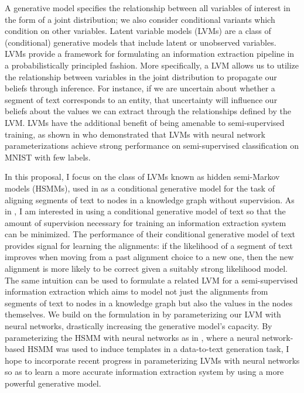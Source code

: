 \documentclass[12pt]{article}
\begin{document}
A generative model specifies the relationship between all variables of interest in
the form of a joint distribution; we also consider conditional variants
which condition on other variables.
Latent variable models (LVMs) are a class of (conditional) generative models
that include latent or unobserved variables.
LVMs provide a framework for formulating an information extraction pipeline
in a probabilistically principled fashion.
More specifically, a LVM allows us to utilize the relationship between
variables in the joint distribution to propagate our beliefs through inference.
For instance, if we are uncertain about whether a segment of text corresponds
to an entity, that uncertainty will influence our beliefs about the values we can extract
through the relationships defined by the LVM.
LVMs have the additional benefit of being amenable to semi-supervised training,
as shown in \citet{kingma2014ssvae} who demonstrated that
LVMs with neural network parameterizations achieve strong performance on
semi-supervised classification on MNIST with few labels.

In this proposal, I focus on the class of LVMs known as hidden semi-Markov models (HSMMs),
used in \citet{liang2009semalign} as a conditional generative model for the
task of aligning segments of text to nodes in a knowledge graph without supervision.
As in \citet{liang2009semalign}, I am interested in using a conditional generative model of text so that
the amount of supervision necessary for training an information extraction system can be minimized.
The performance of their conditional generative model of text provides signal for learning the alignments:
if the likelihood of a segment of text improves when moving from a
past alignment choice to a new one,
then the new alignment is more likely to be correct given a suitably strong likelihood model.
The same intuition can be used to formulate a related LVM for a semi-supervised information extraction
which aims to model not just the alignments from segments of text to nodes in a knowledge graph
but also the values in the nodes themselves.
We build on the formulation in \citet{liang2009semalign} by parameterizing our LVM
with neural networks, drastically increasing the generative model's capacity.
By parameterizing the HSMM with neural networks as in \citet{wiseman2018template},
where a neural network-based HSMM was used to induce templates in a data-to-text generation task,
I hope to incorporate recent progress in parameterizing LVMs with neural networks
so as to learn a more accurate information extraction system by using a more powerful
generative model.
\end{document}
